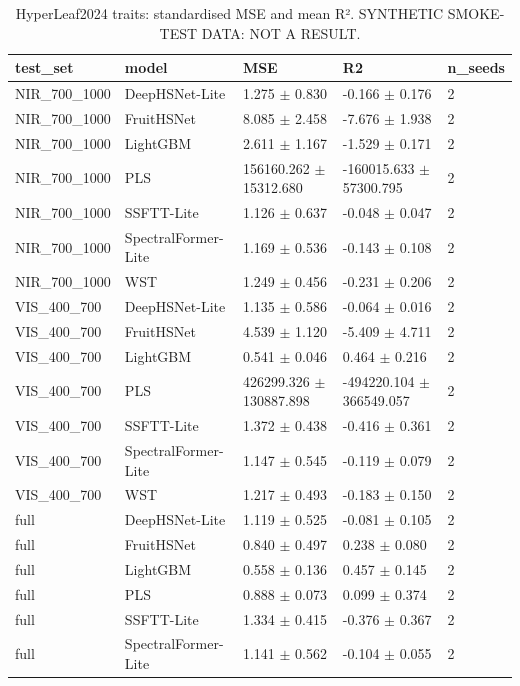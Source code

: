 \begin{table}[t]
\centering
\caption{HyperLeaf2024 traits: standardised MSE and mean R². SYNTHETIC SMOKE-TEST DATA: NOT A RESULT.}
\label{tab:table_hyperleaf_traits}
\begin{tabular}{lllll}
\hline
test\_set & model & MSE & R2 & n\_seeds \\
\hline
NIR\_700\_1000 & DeepHSNet-Lite & 1.275 $\pm$ 0.830 & -0.166 $\pm$ 0.176 & 2 \\
NIR\_700\_1000 & FruitHSNet & 8.085 $\pm$ 2.458 & -7.676 $\pm$ 1.938 & 2 \\
NIR\_700\_1000 & LightGBM & 2.611 $\pm$ 1.167 & -1.529 $\pm$ 0.171 & 2 \\
NIR\_700\_1000 & PLS & 156160.262 $\pm$ 15312.680 & -160015.633 $\pm$ 57300.795 & 2 \\
NIR\_700\_1000 & SSFTT-Lite & 1.126 $\pm$ 0.637 & -0.048 $\pm$ 0.047 & 2 \\
NIR\_700\_1000 & SpectralFormer-Lite & 1.169 $\pm$ 0.536 & -0.143 $\pm$ 0.108 & 2 \\
NIR\_700\_1000 & WST & 1.249 $\pm$ 0.456 & -0.231 $\pm$ 0.206 & 2 \\
VIS\_400\_700 & DeepHSNet-Lite & 1.135 $\pm$ 0.586 & -0.064 $\pm$ 0.016 & 2 \\
VIS\_400\_700 & FruitHSNet & 4.539 $\pm$ 1.120 & -5.409 $\pm$ 4.711 & 2 \\
VIS\_400\_700 & LightGBM & 0.541 $\pm$ 0.046 & 0.464 $\pm$ 0.216 & 2 \\
VIS\_400\_700 & PLS & 426299.326 $\pm$ 130887.898 & -494220.104 $\pm$ 366549.057 & 2 \\
VIS\_400\_700 & SSFTT-Lite & 1.372 $\pm$ 0.438 & -0.416 $\pm$ 0.361 & 2 \\
VIS\_400\_700 & SpectralFormer-Lite & 1.147 $\pm$ 0.545 & -0.119 $\pm$ 0.079 & 2 \\
VIS\_400\_700 & WST & 1.217 $\pm$ 0.493 & -0.183 $\pm$ 0.150 & 2 \\
full & DeepHSNet-Lite & 1.119 $\pm$ 0.525 & -0.081 $\pm$ 0.105 & 2 \\
full & FruitHSNet & 0.840 $\pm$ 0.497 & 0.238 $\pm$ 0.080 & 2 \\
full & LightGBM & 0.558 $\pm$ 0.136 & 0.457 $\pm$ 0.145 & 2 \\
full & PLS & 0.888 $\pm$ 0.073 & 0.099 $\pm$ 0.374 & 2 \\
full & SSFTT-Lite & 1.334 $\pm$ 0.415 & -0.376 $\pm$ 0.367 & 2 \\
full & SpectralFormer-Lite & 1.141 $\pm$ 0.562 & -0.104 $\pm$ 0.055 & 2 \\

\end{tabular}
\end{table}
